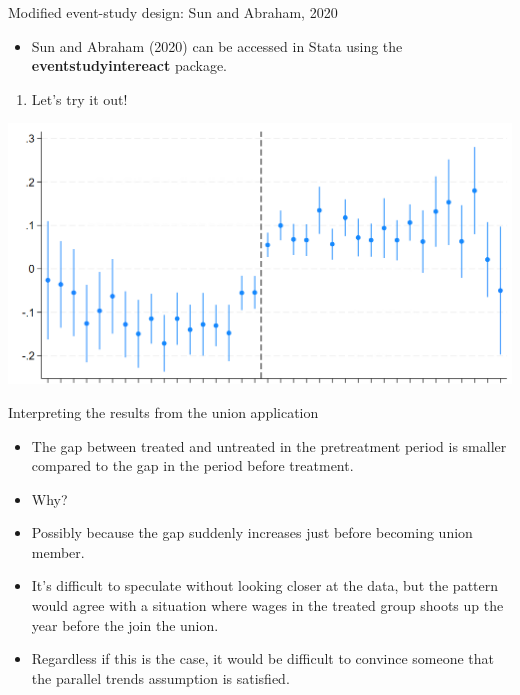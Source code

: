 \documentclass[notes,11pt, aspectratio=169]{beamer}
\begin{document}
\begin{frame}{Modified event-study design: Sun and Abraham, 2020}
\begin{itemize}
    \item Sun and Abraham (2020) can be accessed in Stata using the \textbf{eventstudyintereact} package.
\end{itemize}
\begin{enumerate}
    \item Let's try it out!
\end{enumerate}
\vspace{0.5cm}
    \begin{center}
        \includegraphics[width=0.6\linewidth]{24_DiDLecture/24_DiDLecture_SunAndAbraham.png}
    \end{center} 
\end{frame}

\begin{frame}{Interpreting the results from the union application}
\begin{itemize}
    \item The gap between treated and untreated in the pretreatment period is smaller compared to the gap in the period before treatment.
    \item Why?
    \item Possibly because the gap suddenly increases just before becoming union member.
    \item It's difficult to speculate without looking closer at the data, but the pattern would agree with a situation where wages in the treated group shoots up the year before the join the union.
    \item Regardless if this is the case, it would be difficult to convince someone that the parallel trends assumption is satisfied.
\end{itemize}
\end{frame}
\end{document}

